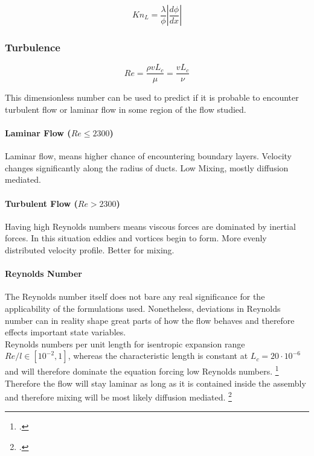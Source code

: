 	$$
	K n_L = \frac{\lambda}{\phi} \left| \frac{d\phi}{dx} \right|
	$$
\newpage

\subsubsection{Turbulence}

	$$
	Re = \frac{\rho v L_c}{\mu} = \frac{v L_c}{\nu}
	$$

	This dimensionless number can be used to predict if it is probable to encounter turbulent flow or laminar flow in some region of the flow studied.
				
\paragraph{Laminar Flow (\(Re \le 2300\))}

	Laminar flow, means higher chance of encountering boundary layers.
	Velocity changes significantly along the radius of ducts.
	Low Mixing, mostly diffusion mediated.


\paragraph{Turbulent Flow (\(Re > 2300\))}

	Having high Reynolds numbers means viscous forces are dominated by inertial forces.
	In this situation eddies and vortices begin to form.
	More evenly distributed velocity profile. Better for mixing. 

\paragraph{Reynolds Number}

	The Reynolds number itself does not bare any real significance for the applicability of the formulations used. Nonetheless, deviations in Reynolds number can in reality shape great parts of how the flow behaves and therefore effects important state variables.\\
	Reynolds numbers per unit length for isentropic expansion range $Re/l \in [10^{-2}, 1]$, whereas the characteristic length is constant at $L_c = 20\cdot 10^{-6}$ and will therefore dominate the equation forcing low Reynolds numbers. \footcite[][681]{ames1953compressible}\\
	Therefore the flow will stay laminar as long as it is contained inside the assembly and therefore mixing will be most likely diffusion mediated.
	\footcite[][16]{comsol_microfluidics_guide} 

